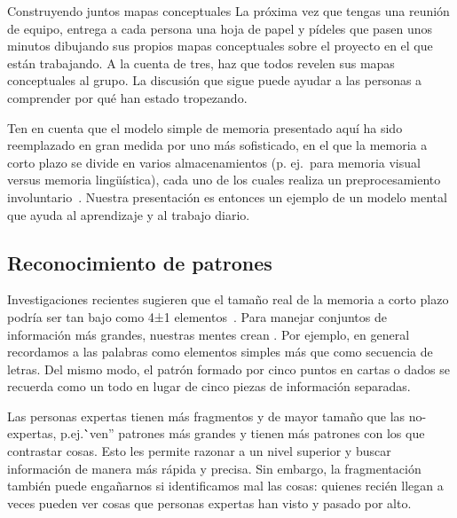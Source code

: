 
\begin{aside}{Construyendo juntos mapas conceptuales}
 La próxima vez que tengas una reunión de equipo,
 entrega a cada persona una hoja de papel
 y pídeles que pasen unos minutos dibujando sus propios mapas conceptuales sobre el proyecto en el que están trabajando.
  A la cuenta de tres,
  haz que todos revelen sus mapas conceptuales al grupo.
  La discusión que sigue puede ayudar a las personas a comprender
  por qué han estado tropezando.
\end{aside}

Ten en cuenta que el modelo simple de memoria presentado aquí ha sido reemplazado en gran medida por uno más sofisticado,
en el que la memoria a corto plazo se divide en varios almacenamientos
(p. ej.\ para memoria visual versus memoria lingüística),
cada uno de los cuales realiza un pre\-procesamiento involuntario~\cite{Mill2016a}.
Nuestra presentación es entonces un ejemplo de un modelo mental que ayuda al aprendizaje y al trabajo diario.

\subsection*{Reconocimiento de patrones}

Investigaciones recientes sugieren que el tamaño real de la memoria a corto plazo 
podría ser tan bajo como 4±1 elementos~\cite{Dida2016}.
Para manejar conjuntos de información más grandes,
nuestras mentes crean .
Por ejemplo,
en general recordamos a las palabras como elementos simples más que como secuencia de letras.
Del mismo modo,
el patrón formado por cinco puntos en cartas o dados se recuerda como un todo 
en lugar de cinco piezas de información separadas.

Las personas expertas tienen más fragmentos y de mayor tamaño que las no-expertas,
p.ej.\``ven'' patrones más grandes y tienen más patrones con los que contrastar cosas.
Esto les permite razonar a un nivel superior
y buscar información de manera más rápida y precisa.
Sin embargo,
la fragmentación también puede engañarnos si identificamos mal las cosas:
quienes recién llegan a veces pueden ver cosas que personas expertas han visto y pasado por alto.

